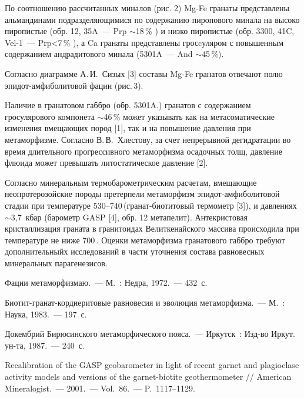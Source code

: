 

По соотношению рассчитанных миналов (рис. 2) Mg-Fe гранаты представлены альмандинами  подразделяющимися  по содержанию пиропового минала на высоко пиропистые (обр. 12, 35A~--- Prp $\sim$18\,\%  ) и низко пиропистые (обр. 3300, 41C, Vel-1~--- Prp<7\,\% ), а Ca гранаты представлены гросcуляром с повышенным содержанием андрадитового минала (5301A~--- And $\sim$45\,\%).

Согласно диаграмме А.\,И.~Сизых [3] составы Mg-Fe гранатов отвечают полю эпидот-амфиболитовой фации (рис.\,3).



Наличие в гранатовом габбро (обр. 5301A.) гранатов  с содержанием гросулярового компонета $\sim$46\,\%  может указывать как на метасоматические изменения  вмещающих пород [1], так и на повышение давления при метаморфизме.  Согласно В.\,В.~Хлестову, за счет  непрерывной  дегидратации во время длительного прогрессивного метаморфизма осадочных толщ, давление флюида  может превышать литостатическое давление [2].

Согласно минеральным термобарометрическим расчетам,  вмещающие неопротерозойские породы претерпели метаморфизм эпидот-амфиболитовой стадии при температуре 530--740\,\dgc (гранат-биотитовый термометр [3]), и давлениях $\sim$3,7~кбар  (барометр GASP [4], обр. 12 метапелит). Антекристовая кристаллизация граната в гранитоидах Велиткенайского массива происходила при температуре не ниже 700\,\dgc. Оценки метаморфизма гранатового габбро требуют дополнительныйх исследований в части уточнения состава равновесных минеральных парагенезисов.
\clearpage
\begin{thebibliography}{99}

\bibitem{} Фации метаморфизмаю.~--- М.~: Недра, 1972.~--- 432~с.

\bibitem{} Биотит-гранат-кордиеритовые равновесия и эволюция метаморфизма.~--- М.~: Наука, 1983.~--- 197~с.

\bibitem{} Докембрий Бирюсинского метаморфического пояса.~--- Иркутск~: Изд-во Иркут. ун-та, 1987.~--- 240~с.


\bibitem{} Recalibration of the GASP geobarometer in light of recent garnet and plagioclase activity models and versions of the garnet-biotite geothermometer // American Mineralogist.~--- 2001.~--- Vol.~86.~--- P.~1117--1129.
\end{thebibliography}
\thispagestyle{empty}
